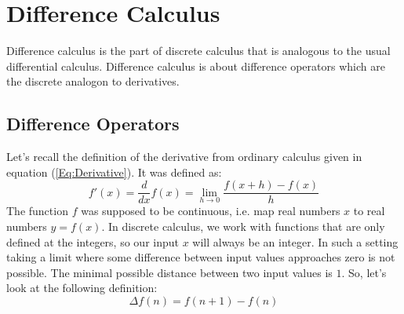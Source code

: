 


\section{Difference Calculus}
Difference calculus is the part of discrete calculus that is analogous to the usual differential calculus. Difference calculus is about difference operators which are the discrete analogon to derivatives.


\subsection{Difference Operators}
Let's recall the definition of the derivative from ordinary calculus given in equation (\ref{Eq:Derivative}). It was defined as:
\begin{equation}
 f'(x) = \frac{d}{dx} f(x) = \lim_{h \rightarrow 0} \frac{f(x + h) - f(x)}{h}
\end{equation}
The function $f$ was supposed to be continuous, i.e. map real numbers $x$ to real numbers $y = f(x)$. In discrete calculus, we work with functions that are only defined at the integers, so our input $x$ will always be an integer. In such a setting taking a limit where some difference between input values approaches zero is not possible. The minimal possible distance between two input values is $1$. So, let's look at the following definition:
\begin{equation}
\label{Eq:ForwardDifference}
 \Delta f(n) = f(n+1) - f(n)
\end{equation}





